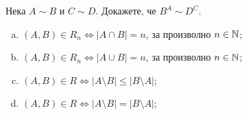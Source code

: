 \begin{problem}
  Нека $A \sim B$ и $C \sim D$. Докажете, че $B^A \sim D^C$.
\end{problem}

\begin{problem}
  
  \begin{enumerate}[a)]
  \item
    $(A, B) \in R_n \iff |A \cap B| = n$, за произволно $n \in \mathbb{N}$;
  \item
    $(A, B) \in R_n \iff |A \cup B| = n$, за произволно $n \in \mathbb{N}$;
  \item
    $(A,B) \in R \iff |A \setminus B| \leq |B\setminus A|$;
  \item 
    $(A,B) \in R \iff |A \setminus B| = |B\setminus A|$;
  \end{enumerate}
\end{problem}



